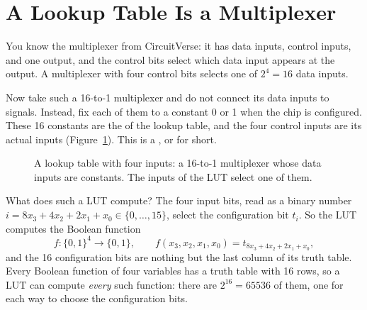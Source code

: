 \section{A Lookup Table Is a Multiplexer}
\label{sec:lut}

You know the multiplexer from CircuitVerse: it has data inputs, control inputs,
and one output, and the control bits select which data input appears at the
output. A multiplexer with four control bits selects one of $2^4 = 16$ data
inputs.

Now take such a 16-to-1 multiplexer and do not connect its data inputs to
signals. Instead, fix each of them to a constant 0 or 1 when the chip is
configured. These 16 constants are the  of the
lookup table, and the four control inputs are its actual inputs
(Figure~\ref{fig:lut}). This is a , or  for short.

\begin{figure}[ht]
\centering
{}
\caption{A lookup table with four inputs: a 16-to-1 multiplexer whose data
inputs are constants. The inputs of the LUT select one of them.}
\label{fig:lut}
\end{figure}

What does such a LUT compute? The four input bits, read as a binary number
$i = 8x_3 + 4x_2 + 2x_1 + x_0 \in \{0, \dots, 15\}$, select the configuration
bit $t_i$. So the LUT computes the Boolean function
\[
  f\colon \{0,1\}^4 \to \{0,1\}, \qquad
  f(x_3, x_2, x_1, x_0) = t_{8x_3+4x_2+2x_1+x_0},
\]
and the 16 configuration bits are nothing but the last column of its truth
table. Every Boolean function of four variables has a truth table with 16 rows,
so a LUT can compute \emph{every} such function: there are $2^{16} = 65536$ of
them, one for each way to choose the configuration bits.

